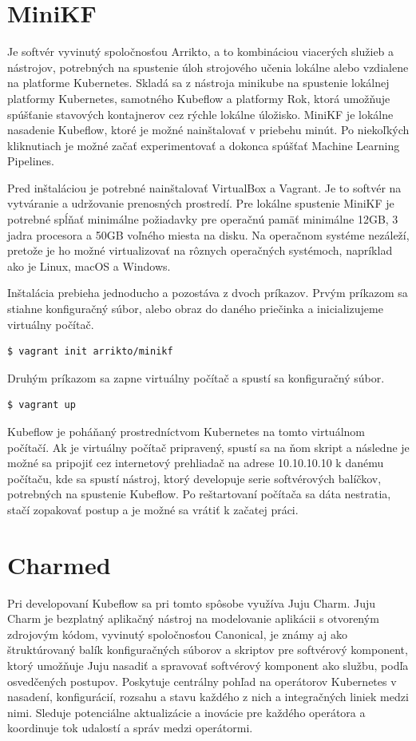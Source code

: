 \section{MiniKF}

Je softvér vyvinutý spoločnosťou Arrikto, a to kombináciou viacerých služieb a nástrojov, potrebných na spustenie úloh strojového učenia lokálne alebo vzdialene na platforme Kubernetes. Skladá sa z nástroja minikube na spustenie lokálnej platformy Kubernetes, samotného Kubeflow a platformy Rok, ktorá umožňuje spúšťanie stavových kontajnerov cez rýchle lokálne úložisko. MiniKF je lokálne nasadenie Kubeflow, ktoré je možné nainštalovať v priebehu minút. Po niekoľkých kliknutiach je možné začať experimentovať a dokonca spúšťať Machine Learning Pipelines.

Pred inštaláciou je potrebné nainštalovať VirtualBox a Vagrant. Je to softvér na vytváranie a udržovanie prenosných prostredí. Pre lokálne spustenie MiniKF je potrebné spĺňať minimálne požiadavky pre operačnú pamäť minimálne 12GB, 3 jadra procesora a 50GB voľného miesta na disku. Na operačnom systéme nezáleží, pretože je ho možné virtualizovať na rôznych operačných systémoch, napríklad ako je Linux, macOS a Windows.

Inštalácia prebieha jednoducho a pozostáva z dvoch príkazov. Prvým príkazom sa stiahne konfiguračný súbor, alebo obraz do daného priečinka a inicializujeme virtuálny počítač.
\begin{lstlisting}[language=Bash]
    $ vagrant init arrikto/minikf
    \end{lstlisting}
Druhým príkazom sa zapne virtuálny počítač a spustí sa konfiguračný súbor.
\begin{lstlisting}[language=Bash]
    $ vagrant up
    \end{lstlisting}
Kubeflow je poháňaný prostredníctvom Kubernetes na tomto virtuálnom počítačí. Ak je virtuálny počítač pripravený, spustí sa na ňom skript a následne je možné sa pripojiť cez internetový prehliadač na adrese 10.10.10.10 k danému počítaču, kde sa spustí nástroj, ktorý developuje serie softvérových balíčkov, potrebných na spustenie Kubeflow. Po reštartovaní počítača sa dáta nestratia, stačí zopakovať postup a je možné sa vrátiť k začatej práci.

\section{Charmed}

Pri developovaní Kubeflow sa pri tomto spôsobe využíva Juju Charm. Juju Charm je bezplatný aplikačný nástroj na modelovanie aplikácii s otvoreným zdrojovým kódom, vyvinutý spoločnosťou Canonical, je známy aj ako štruktúrovaný balík konfiguračných súborov a skriptov pre softvérový komponent, ktorý umožňuje Juju nasadiť a spravovať softvérový komponent ako službu, podľa osvedčených postupov. Poskytuje centrálny pohľad na operátorov Kubernetes v nasadení, konfigurácií, rozsahu a stavu každého z nich a integračných liniek medzi nimi. Sleduje potenciálne aktualizácie a inovácie pre každého operátora a koordinuje tok udalostí a správ medzi operátormi.

